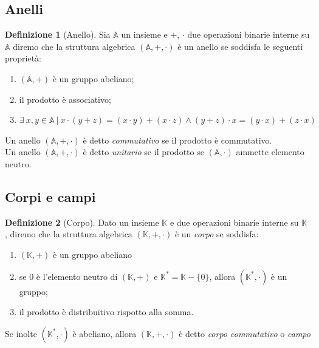 \documentclass{book}
\theoremstyle{definition}
\newtheorem{definizione}{Definizione}
\newcommand{\An}{\mathbb{A}}
\newcommand{\Anello}{(\An, +, \per)}
\newcommand{\per}{\cdot}
\begin{document}
\subsection{Anelli}

\begin{definizione}[Anello]
    Sia $\An$ un insieme e $+$, $\per$ due operazioni binarie interne su $\An$ 
    diremo che la struttura algebrica $(\An, +, \per)$ è un anello se soddisfa le seguenti proprietà:
    \begin{enumerate}[label=(A\arabic*.),itemindent=*]
        \item $(\An, +)$ è un gruppo abeliano;
        \item il prodotto è associativo;
        \item $\exists \ x, y \in \An \ | \ x \per ( y + z ) = (x \per y) + (x \per z) \land ( y + z ) \per x = ( y \per x ) + (z \per x )$
    \end{enumerate}
\end{definizione}

\medskip

Un anello $\Anello$ è detto \emph{commutativo} se il prodotto è commutativo.\\
Un anello $\Anello$ è detto \emph{unitario} se il prodotto se $(\mathbb{A}, \per)$ ammette elemento neutro.

\subsection{Corpi e campi}

\begin{definizione}[Corpo]
    Dato un insieme $\mathbb{K}$ e due operazioni binarie interne su $\mathbb{K}$ , diremo che la struttura algebrica $(\mathbb{K} , +, \cdot)$ è un \textit{corpo} se soddisfa:
    \begin{enumerate}[label=(K\arabic*.),itemindent=*]
        \item $(\mathbb{K}, +)$ è un gruppo abeliano
        \item se 0 è l'elemento neutro di $(\mathbb{K}, +)$ e $\mathbb{K}^{*} = \mathbb{K} - \{0\}$, allora $(\mathbb{K}^{*}, \per)$ è un gruppo;
        \item il prodotto è distribuitivo rispotto alla somma.    
    \end{enumerate}

    Se inolte $(\mathbb{K}^{*}, \per)$ è abeliano, allora $(\mathbb{K} , +, \cdot)$ è detto \emph{corpo commutativo} o \emph{campo}
\end{definizione}
\end{document}
